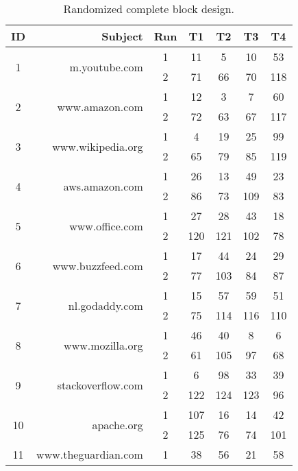 \begin{table}[ht]
\centering
\caption{Randomized complete block design.} 

\begin{threeparttable}
\begin{tabular}{cr|c|cccc}
\toprule
 ID & Subject &  Run  &  T1\tnote{a} & T2\tnote{a} & T3\tnote{a} & T4\tnote{a} \\
\midrule
  \multirow{2}{*}{1} &        \multirow{2}{*}{m.youtube.com} &       1 &  11 & 5 & 10 & 53 \\
&&2 &  71 & 66 & 70 & 118 \\
\midrule
  \multirow{2}{*}{2} &       \multirow{2}{*}{www.amazon.com} &       1 &  12 & 3 & 7 & 60 \\
&&2 &  72 & 63 & 67 & 117 \\
\midrule
  \multirow{2}{*}{3} &    \multirow{2}{*}{www.wikipedia.org} &       1 &  4 & 19 & 25 & 99 \\
&&2 &  65 & 79 & 85 & 119 \\
\midrule
  \multirow{2}{*}{4} &       \multirow{2}{*}{aws.amazon.com} &       1 &  26 & 13 & 49 & 23 \\
&&2 &  86 & 73 & 109 & 83 \\
\midrule
  \multirow{2}{*}{5} &       \multirow{2}{*}{www.office.com} &       1 &  27 & 28 & 43 & 18 \\
&&2 &  120 & 121 & 102 & 78 \\
\midrule
  \multirow{2}{*}{6} &     \multirow{2}{*}{www.buzzfeed.com} &       1 &  17 & 44 & 24 & 29 \\
&&2 &  77 & 103 & 84 & 87 \\
\midrule
  \multirow{2}{*}{7} &       \multirow{2}{*}{nl.godaddy.com} &       1 &  15 & 57 & 59 & 51 \\
&&2 &  75 & 114 & 116 & 110  \\
\midrule
  \multirow{2}{*}{8} &      \multirow{2}{*}{www.mozilla.org} &       1 &  46 & 40 & 8 & 6 \\
&&2 &  61 & 105 & 97 & 68 \\
\midrule
  \multirow{2}{*}{9} &    \multirow{2}{*}{stackoverflow.com} &       1 &  6 & 98 & 33 & 39 \\
&&2 &  122 & 124 & 123 & 96 \\
\midrule
 \multirow{2}{*}{10} &           \multirow{2}{*}{apache.org} &       1 &  107 & 16 & 14 & 42 \\
 &&2 &  125 & 76 & 74 & 101 \\
\midrule
 \multirow{2}{*}{11} &  \multirow{2}{*}{www.theguardian.com} &       1 &  38 & 56 & 21 & 58 \\

\end{tabular}
\end{threeparttable}
\end{table}
